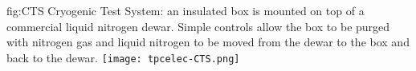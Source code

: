 \begin{dunefigure}
{fig:CTS}
{Cryogenic Test System: an insulated box is mounted on top of a commercial liquid nitrogen dewar.  Simple controls allow the box to be purged with nitrogen gas and liquid nitrogen to be moved from the dewar to the box and back to the dewar.}
\texttt{[image: tpcelec-CTS.png]}
\end{dunefigure}

